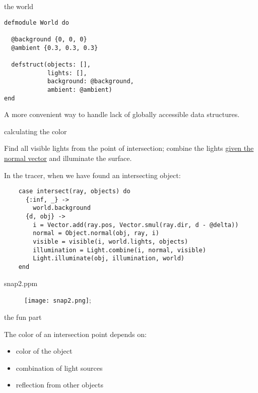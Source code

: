 \begin{frame}[fragile]{the world}

\begin{verbatim}
defmodule World do

  @background {0, 0, 0}
  @ambient {0.3, 0.3, 0.3}

  defstruct(objects: [],
            lights: [],
            background: @background,
            ambient: @ambient)
end
\end{verbatim}

\pause A more convenient way to handle lack of  globally accessible data structures.
 
\end{frame}

\begin{frame}[fragile]{calculating the color}

  Find all visible lights from the point of intersection; combine the
  lights \underline{given the normal vector} and illuminate the
  surface.  

\vspace{10pt} \pause

  In the tracer, when we have found an intersecting object:

\begin{verbatim}
    case intersect(ray, objects) do
      {:inf, _} ->
        world.background
      {d, obj} ->
        i = Vector.add(ray.pos, Vector.smul(ray.dir, d - @delta))
        normal = Object.normal(obj, ray, i)
        visible = visible(i, world.lights, objects)
        illumination = Light.combine(i, normal, visible)
        Light.illuminate(obj, illumination, world)
    end
\end{verbatim}

\end{frame}


\begin{frame}{snap2.ppm}

\begin{figure}
\texttt{[image: snap2.png]};
\end{figure}

\end{frame}

\begin{frame}{the fun part}

The color of an intersection point depends on:

\begin{itemize}
 \pause \item color of the object
 \pause \item combination of light sources 
 \pause \item reflection from other objects
\end{itemize}

\end{frame}


